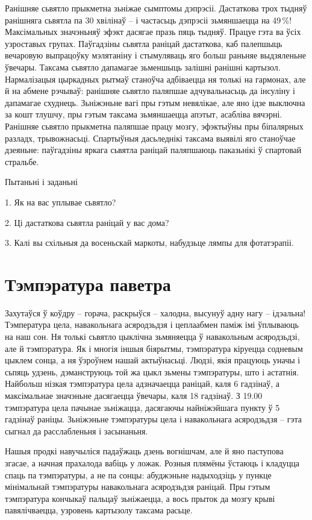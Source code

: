 Ранішняе сьвятло прыкметна зьніжае сымптомы дэпрэсіі. Дастаткова трох тыдняў ранішняга сьвятла па 30 хвілінаў – і частасьць дэпрэсіі зьмяншаецца на 49\,\%! Максімальных значэньняў эфэкт дасягае празь пяць тыдняў. Працуе гэта ва ўсіх узроставых групах. Паўгадзіны сьвятла раніцай дастаткова, каб палепшыць вечаровую выпрацоўку мэлятаніну і стымуляваць яго больш раньняе выдзяленьне ўвечары. Таксама сьвятло дапамагае зьменшыць залішні ранішні картызол. Нармалізацыя цыркадных рытмаў станоўча адбіваецца ня толькі на гармонах, але й на абмене рэчываў: ранішняе сьвятло паляпшае адчувальнасьць да інсуліну і дапамагае схуднець. Зьніжэньне вагі пры гэтым невялікае, але яно ідзе выключна за кошт тлушчу, пры гэтым таксама зьмяншаецца апэтыт, асабліва вячэрні. Ранішняе сьвятло прыкметна паляпшае працу мозгу, эфэктыўны пры біпалярных разладх, трывожнасьці. Спартыўныя дасьледнікі таксама выявілі яго станоўчае дзеяньне: паўгадзіны яркага сьвятла раніцай паляпшаюць паказьнікі ў спартовай стральбе.

Пытаньні і заданьні

1. Як на вас уплывае сьвятло?

2. Ці дастаткова сьвятла раніцай у вас дома?

3. Калі вы схільныя да восеньскай маркоты, набудзьце лямпы для фотатэрапіі.


\section{Тэмпэратура паветра}

Захутаўся ў коўдру – горача, раскрыўся – халодна, высунуў адну нагу – ідэальна! Тэмпература цела, навакольнага асяродзьдзя і цеплаабмен паміж імі ўплываюць на наш сон. Ня толькі сьвятло цыклічна зьмяняецца ў навакольным асяродзьдзі, але й тэмпэратура. Як і многія іншыя біярытмы, тэмпэратура кіруецца содневым цыклем сонца, а ня ўзроўнем нашай актыўнасьці. Людзі, якія працуюць уначы і сьпяць удзень, дэманструюць той жа цыкл зьмены тэмпэратуры, што і астатнія. Найбольш нізкая тэмпэратура цела адзначаецца раніцай, каля 6 гадзінаў, а максімальнае значэньне дасягаецца ўвечары, каля 18 гадзінаў. З 19.00 тэмпэратура цела пачынае зьніжацца, дасягаючы найніжэйшага пункту ў 5 гадзінаў раніцы. Зьніжэньне тэмпэратуры цела і навакольнага асяродзьдзя – гэта сыгнал да расслабленьня і засынаньня.

Нашыя продкі навучыліся падаўжаць дзень вогнішчам, але й яно паступова згасае, а начная прахалода вабіць у ложак. Розныя плямёны ўстаюць і кладуцца спаць па тэмпэратуры, а не па сонцы: абуджэньне надыходзіць у пункце мінімальнай тэмпэратуры навакольнага асяродзьдзя раніцай. Пры гэтым тэмпэратура кончыкаў пальцаў зьніжаецца, а вось прыток да мозгу крыві павялічваецца, узровень картызолу таксама расьце.

